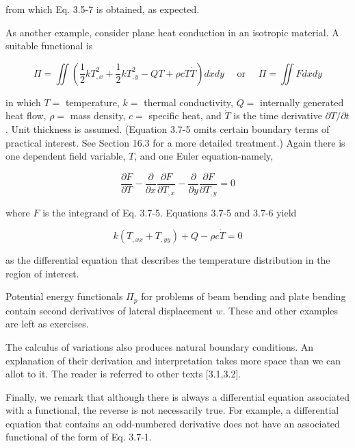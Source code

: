\documentclass[10pt]{article}
\begin{document}
from which Eq. 3.5-7 is obtained, as expected.

As another example, consider plane heat conduction in an isotropic material. A suitable functional is

\begin{equation*}
\Pi=\iint\left(\frac{1}{2} k T^{2}_{,x}+\frac{1}{2} k T^{2}_{,y}-Q T+\rho c T \dot{T}\right) d x d y \quad \text { or } \quad \Pi=\iint F d x d y \tag{3.7-5}
\end{equation*}

in which $T=$ temperature, $k=$ thermal conductivity, $Q=$ internally generated heat flow, $\rho=$ mass density, $c=$ specific heat, and $\dot{T}$ is the time derivative $\partial T / \partial t$. Unit thickness is assumed. (Equation 3.7-5 omits certain boundary terms of practical interest. See Section 16.3 for a more detailed treatment.) Again there is one dependent field variable, $T$, and one Euler equation-namely,

\begin{equation*}
\frac{\partial F}{\partial T}-\frac{\partial}{\partial x} \frac{\partial F}{\partial T_{, x}}-\frac{\partial}{\partial y} \frac{\partial F}{\partial T_{, y}}=0 \tag{3.7-6}
\end{equation*}

where $F$ is the integrand of Eq. 3.7-5. Equations 3.7-5 and 3.7-6 yield

\begin{equation*}
k\left(T_{, x x}+T_{, y y}\right)+Q-\rho c \dot{T}=0 \tag{3.7-7}
\end{equation*}

as the differential equation that describes the temperature distribution in the region of interest.

Potential energy functionals $\Pi_{p}$ for problems of beam bending and plate bending contain second derivatives of lateral displacement $w$. These and other examples are left as exercises.

The calculus of variations also produces natural boundary conditions. An explanation of their derivation and interpretation takes more space than we can allot to it. The reader is referred to other texts [3.1,3.2].

Finally, we remark that although there is always a differential equation associated with a functional, the reverse is not necessarily true. For example, a differential equation that contains an odd-numbered derivative does not have an associated functional of the form of Eq. 3.7-1.
\end{document}
